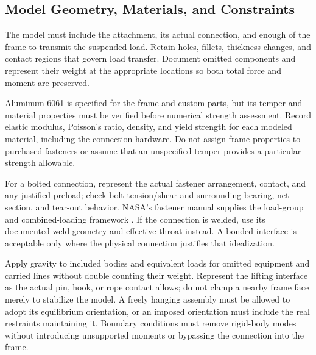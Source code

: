 
\subsection{Model Geometry, Materials, and Constraints}
The model must include the attachment, its actual connection, and enough of the frame to transmit the suspended load. Retain holes, fillets, thickness changes, and contact regions that govern load transfer. Document omitted components and represent their weight at the appropriate locations so both total force and moment are preserved.

Aluminum 6061 is specified for the frame and custom parts, but its temper and material properties must be verified before numerical strength assessment. Record elastic modulus, Poisson's ratio, density, and yield strength for each modeled material, including the connection hardware. Do not assign frame properties to purchased fasteners or assume that an unspecified temper provides a particular strength allowable.

For a bolted connection, represent the actual fastener arrangement, contact, and any justified preload; check bolt tension/shear and surrounding bearing, net-section, and tear-out behavior. NASA's fastener manual supplies the load-group and combined-loading framework \citep{barrett1990Fasteners}. If the connection is welded, use its documented weld geometry and effective throat instead. A bonded interface is acceptable only where the physical connection justifies that idealization.

Apply gravity to included bodies and equivalent loads for omitted equipment and carried lines without double counting their weight. Represent the lifting interface as the actual pin, hook, or rope contact allows; do not clamp a nearby frame face merely to stabilize the model. A freely hanging assembly must be allowed to adopt its equilibrium orientation, or an imposed orientation must include the real restraints maintaining it. Boundary conditions must remove rigid-body modes without introducing unsupported moments or bypassing the connection into the frame.


